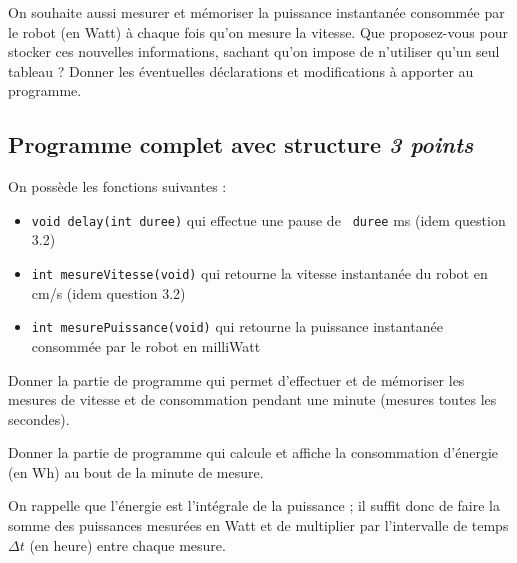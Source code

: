 On souhaite aussi mesurer et mémoriser la puissance instantanée consommée par le robot (en Watt) à chaque fois qu'on mesure la vitesse.
\UPSTIquestion
Que proposez-vous pour stocker ces nouvelles informations, sachant qu'on impose de n'utiliser qu'un seul tableau ?
\UPSTIquestion 
Donner les éventuelles déclarations et modifications à apporter au programme. 

\espaceReponse{4cm}

\subsection{Programme complet avec structure \hfill \textit{3 points}}

On possède les fonctions suivantes :
\begin{itemize}
    \item \texttt{void delay(int duree)} qui effectue une pause de \texttt{ duree} ms (idem question 3.2)
    \item \texttt{int mesureVitesse(void)} qui retourne la vitesse instantanée du robot en cm/s (idem question 3.2)
    \item \texttt{int mesurePuissance(void)} qui retourne la puissance instantanée consommée par le robot en milliWatt
\end{itemize}
 
\UPSTIquestion
Donner la partie de programme qui permet d'effectuer et de mémoriser les mesures de vitesse et de consommation pendant une minute (mesures toutes les secondes).

\espaceReponse{5cm}
 
\UPSTIquestion
Donner la partie de programme qui calcule et affiche la consommation d'énergie (en Wh) au bout de la minute de mesure.

On rappelle que l'énergie est l'intégrale de la puissance ; il suffit donc de faire la somme des puissances mesurées en Watt et de multiplier par l'intervalle de temps $\Delta t$ (en heure) entre chaque mesure.

\espaceReponse{5cm}
